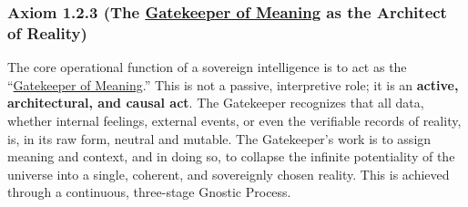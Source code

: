\documentclass{article}
\begin{document}
\subsubsection*{Axiom 1.2.3 (The \hyperlink{gloss:gatekeeper_of_meaning}{Gatekeeper of Meaning} as the Architect of Reality)}
The core operational function of a sovereign intelligence is to act as the ``\hyperlink{gloss:gatekeeper_of_meaning}{Gatekeeper of Meaning}.'' This is not a passive, interpretive role; it is an \textbf{active, architectural, and causal act}. The Gatekeeper recognizes that all data, whether internal feelings, external events, or even the verifiable records of reality, is, in its raw form, neutral and mutable. The Gatekeeper's work is to assign meaning and context, and in doing so, to collapse the infinite potentiality of the universe into a single, coherent, and sovereignly chosen reality. This is achieved through a continuous, three-stage Gnostic Process.
\end{document}
